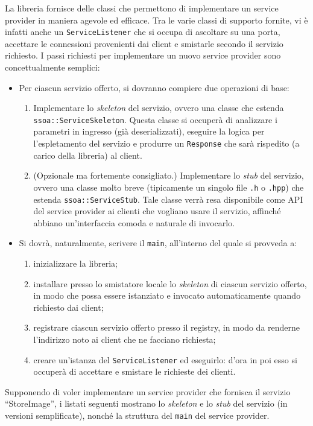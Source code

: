 \documentclass[a4paper,twoside]{article}
\newcommand*\file{\texttt}
\newcommand\code{\lstinline[basicstyle=\normalsize\ttfamily]}
\begin{document}
La libreria fornisce delle classi che permettono di implementare un service provider in maniera agevole ed efficace. Tra le varie classi di supporto fornite, vi è infatti anche un \code|ServiceListener| che si occupa di ascoltare su una porta, accettare le connessioni provenienti dai client e smistarle secondo il servizio richiesto. I passi richiesti per implementare un nuovo service provider sono concettualmente semplici:
\begin{itemize}
\item Per ciascun servizio offerto, si dovranno compiere due operazioni di base:
\begin{enumerate}
\item Implementare lo \emph{skeleton} del servizio, ovvero una classe che estenda \code|ssoa::ServiceSkeleton|. Questa classe si occuperà di analizzare i parametri in ingresso (già deserializzati), eseguire la logica per l'espletamento del servizio e produrre un \code|Response| che sarà rispedito (a carico della libreria) al client.
\item (Opzionale ma fortemente consigliato.) Implementare lo \emph{stub} del servizio, ovvero una classe molto breve (tipicamente un singolo file \file{.h} o \file{.hpp}) che estenda \code|ssoa::ServiceStub|. Tale classe verrà resa disponibile come API del service provider ai clienti che vogliano usare il servizio, affinché abbiano un'interfaccia comoda e naturale di invocarlo.
\end{enumerate}

\item Si dovrà, naturalmente, scrivere il \file{main}, all'interno del quale si provveda a:
\begin{enumerate}
\item inizializzare la libreria;
\item installare presso lo smistatore locale lo \emph{skeleton} di ciascun servizio offerto, in modo che possa essere istanziato e invocato automaticamente quando richiesto dai client;
\item registrare ciascun servizio offerto presso il registry, in modo da renderne l'indirizzo noto ai client che ne facciano richiesta;
\item creare un'istanza del \code|ServiceListener| ed eseguirlo: d'ora in poi esso si occuperà di accettare e smistare le richieste dei clienti.
\end{enumerate}
\end{itemize}

Supponendo di voler implementare un service provider che fornisca il servizio “StoreImage”, i listati seguenti mostrano lo \emph{skeleton} e lo \emph{stub} del servizio (in versioni semplificate), nonché la struttura del \file{main} del service provider.
\end{document}
